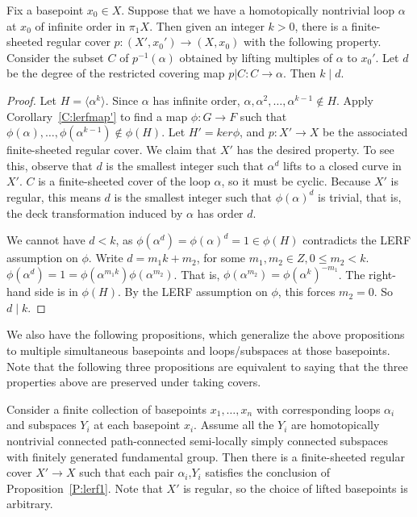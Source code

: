 \begin{prop}\label{P:lerf3}

Fix a basepoint $x_0 \in X$.  Suppose that we have a homotopically nontrivial
loop $\alpha$ at $x_0$ of infinite order in $\pi_1X$.  Then given an integer
$k>0$, there is a finite-sheeted regular cover $p \colon (X',x_0') \to (X,x_0)$
with the following property.  Consider the subset $C$ of $p^{-1}(\alpha)$
obtained by lifting multiples of $\alpha$ to $x_0'$. Let $d$ be the degree of
the restricted covering map $p|C \colon C \to \alpha$. Then $k \mid d$.

\end{prop}

\begin{proof}

Let $H = \langle\alpha^k\rangle$. Since $\alpha$ has infinite order,
$\alpha,\alpha^2,\dots,\alpha^{k-1} \notin H$. Apply Corollary~\ref{C:lerfmap'}
to find a map $\phi \colon G \to F$ such that
$\phi(\alpha),\dots,\phi(\alpha^{k-1}) \notin \phi(H)$. Let $H' = ker \phi$,
and $p \colon X' \to X$ be the associated finite-sheeted regular cover.  We
claim that $X'$ has the desired property. To see this, observe that $d$ is the
smallest integer such that $\alpha^d$ lifts to a closed curve in $X'$. $C$ is
a finite-sheeted cover of the loop $\alpha$, so it must be cyclic. Because $X'$
is regular, this means $d$ is the smallest integer such that $\phi(\alpha)^d$
is trivial, that is, the deck transformation induced by $\alpha$ has order $d$.

We cannot have $d<k$, as $\phi(\alpha^d)=\phi(\alpha)^d=1 \in \phi(H)$
contradicts the LERF assumption on $\phi$. Write $d = m_1k + m_2$, for some
$m_1,m_2 \in Z, 0 \leq m_2 < k$.
$\phi(\alpha^d)=1=\phi(\alpha^{m_1k})\phi(\alpha^{m_2})$.  That is,
$\phi(\alpha^{m_2})=\phi(\alpha^k)^{-m_1}$. The right-hand side is in
$\phi(H)$.  By the LERF assumption on $\phi$, this forces $m_2=0$. So $d \mid
k$.

\end{proof}

We also have the following propositions, which generalize the above
propositions to multiple simultaneous basepoints and loops/subspaces at those
basepoints. Note that the following three propositions are equivalent to saying
that the three properties above are preserved under taking covers.

\begin{prop}\label{P:lerf1'}

Consider a finite collection of basepoints $x_1,\dots,x_n$ with corresponding
loops $\alpha_i$ and subspaces $Y_i$ at each basepoint $x_i$. Assume all the
$Y_i$ are homotopically nontrivial connected path-connected semi-locally simply
connected subspaces with finitely generated fundamental group. Then there is
a finite-sheeted regular cover $X' \to X$ such that each pair $\alpha_i$,$Y_i$
satisfies the conclusion of Proposition~\ref{P:lerf1}.  Note that $X'$ is
regular, so the choice of lifted basepoints is arbitrary.

\end{prop}

